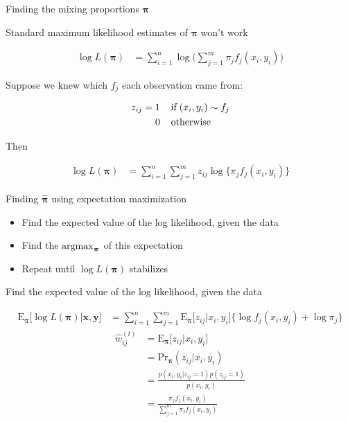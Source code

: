 \documentclass{beamer}
\newcommand{\eqn}[1]{\begin{align*}
#1
\end{align*}}
\newcommand{\eqnl}[2]{\begin{align} \label{#1}
#2
\end{align}}
\newcommand{\vect}[1]{\boldsymbol{\mathbf{#1}}}
\newcommand{\bl}{\big\{}
\newcommand{\br}{\big\}}
\newcommand{\argmax}{\operatornamewithlimits{argmax}}
\newcommand{\vx}{\vect{x}}
\newcommand{\vy}{\vect{y}}
\newcommand{\vp}{\vect{\pi}}
\newcommand{\vph}{\hat{\vect{\pi}}}
\newcommand{\sumn}{\sum^n_{i=1}}
\newcommand{\summ}{\sum^m_{j=1}}
\newcommand{\fab}{f_j}
\newcommand{\llp}{\log L(\vp)}
\begin{document}
\begin{frame}{Finding the mixing proportions $\vect{\pi}$}
	
	Standard maximum likelihood estimates of $\vp$ won't work
	
	\eqn{
		\log L(\vect{\pi}) &= \sumn \log \Big( \summ \pi_j \fab(x_i,y_i)  \Big)
	}
	
	
	Suppose we knew which $f_j$ each observation came from:
	
	\eqn{
		z_{ij} 	= \hspace{1mm} & 1  \hspace{4mm} \text{if} \hspace{1mm} (x_i,y_i) \sim f_j	\\
				& 0 \hspace{4mm} \text{otherwise}
	}
	
	Then
	
	\eqnl{loglike}{
		\log L(\vect{\pi}) &= \sumn \summ z_{ij}  \log \bl \pi_j  \fab(x_i,y_i) \br
	}
	
	
	
\end{frame}










\begin{frame}{Finding $\vph$ using expectation maximization}
	
	
	\begin{itemize}
		\item Find the expected value of the log likelihood, given the data
		\item Find the $\argmax_{\vp}$ of this expectation
		\item Repeat until $\llp$ stabilizes
	\end{itemize}
	
	
\end{frame}










\begin{frame}{Find the expected value of the log likelihood, given the data}
	
	
	
	\eqn{
		\text{E}_{\vp}\Big[\llp \big| \vx,\vy \Big] &= \sumn \summ \text{E}_{\vp}\big[z_{ij}|x_i,y_i\big] \bl \log \fab(x_i,y_i) + \log \pi_j  \br
	}
	\eqn{
		\hat{w}_{ij}^{(t)} 	&= \text{E}_{\vp}\Big[  z_{ij} | x_i, y_i \Big] 		\\
						&= \text{Pr}_{\vp}(z_{ij}|x_i,y_i)	\\
						&= \frac{p(x_i,y_i|z_{ij}=1)p(z_{ij}=1)}{p(x_i,y_i)}	\\
						&=  \frac{\pi_j \fab(x_i,y_i)  }{\summ \pi_j \fab(x_i,y_i)}
	}
	
	
	
\end{frame}
\end{document}
